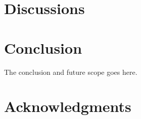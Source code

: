 \documentclass[10pt,journal,compsoc]{IEEEtran}
\begin{document}
\section{Discussions}

\section{Conclusion}
The conclusion and future scope goes here.






%





\ifCLASSOPTIONcompsoc
  \section*{Acknowledgments}
\else
\end{document}
